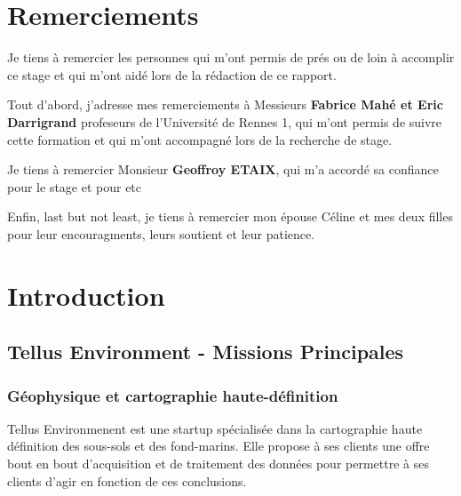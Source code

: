 \documentclass[12pt,a4paper]{report}
\begin{document}
\listoftodos


\cleardoublepage%

\chapter*{Remerciements}%
\thispagestyle{empty}%


Je tiens à remercier les personnes qui m'ont permis de prés ou de loin à accomplir ce stage et qui m'ont aidé lors de la rédaction de ce rapport.

Tout d'abord, j'adresse mes remerciements à Messieurs \textbf{Fabrice Mahé et Eric Darrigrand} profeseurs de l'Université de Rennes 1, qui m'ont permis de suivre cette formation et qui m'ont accompagné lors de la recherche de stage.

Je tiens à remercier Monsieur \textbf{Geoffroy ETAIX}, qui m'a accordé sa confiance pour le stage et pour etc 

Enfin, last but not least, je tiens à remercier mon épouse Céline et mes deux filles pour leur encouragments, leurs soutient et leur patience.


\tableofcontents
\newpage

\chapter{Introduction}
	\section{Tellus Environment - Missions Principales}
	
	\subsection{Géophysique et cartographie haute-définition}
	Tellus Environmenent est une startup spécialisée dans la cartographie haute définition des sous-sols et des fond-marins. Elle propose à ses clients une offre bout en bout d'acquisition et de traitement des données pour permettre à ses clients d'agir en fonction de ces conclusions.
	
\end{document}
